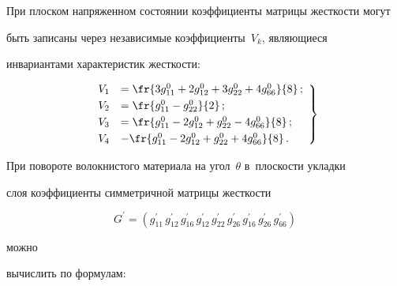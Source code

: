 При плоском напряженном состоянии коэффициенты матрицы жесткости могут 


быть записаны через независимые коэффициенты~$V_k$, являющиеся 


инвариантами характеристик жесткости:


\begin{equation}


\left.


\begin{array}{rl}


V_1&=\fr{3g_{11}^0+2g_{12}^0+3g_{22}^0+4g_{66}^0}{8}\,;\\[3pt]


V_2&= \fr{g_{11}^0-g_{22}^0}{2}\,;\\[3pt]


V_3 &= \fr{g_{11}^0 -2g_{12}^0 +g_{22}^0 -4g_{66}^0}{8}\,;\\[3pt]


V_4 &- \fr{g_{11}^0 -2g_{12}^0 +g_{22}^0 +4g_{66}^0}{8}\,.


\end{array}


\right\}


\label{e1-ab}


\end{equation}


При повороте волокнистого материала на угол~$\theta$ в~плос\-кости уклад\-ки 


слоя коэффициенты симметричной мат\-ри\-цы жест\-кости 


$$


G^\prime = 


\left(g_{11}^\prime\, g_{12}^\prime\, g_{16}^\prime\, g_{12}^\prime\, g_{22}^\prime\, 


g_{26}^\prime\, g_{16}^\prime\, g_{26}^\prime\, g_{66}^\prime\right)


$$ 





     \vspace*{-3pt}


     


     \noindent


мож\-но 


вычислить по формулам:


